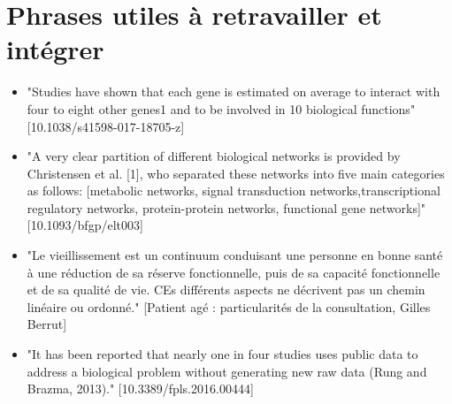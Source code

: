 \section*{Phrases utiles à retravailler et intégrer}

\begin{itemize}
\item "Studies have shown that each gene is estimated on average to interact with four to eight other genes1 and to be involved in 10 biological functions" [10.1038/s41598-017-18705-z]
\item "A very clear partition of different biological networks is provided by Christensen et al. [1], who separated these networks into five main categories as follows: [metabolic networks, signal transduction networks,transcriptional regulatory networks, protein-protein networks, functional gene networks]" [10.1093/bfgp/elt003]
\item "Le vieillissement est un continuum conduisant une personne en bonne santé à une réduction de sa réserve fonctionnelle, puis de sa capacité fonctionnelle et de sa qualité de vie. CEs différents aspects ne décrivent pas un chemin linéaire ou ordonné." [Patient agé : particularités de la consultation, Gilles Berrut]
\item "It has been reported that nearly one in four studies uses public data to address a biological problem without generating new raw data (Rung and Brazma, 2013)." [10.3389/fpls.2016.00444]
\end{itemize}






